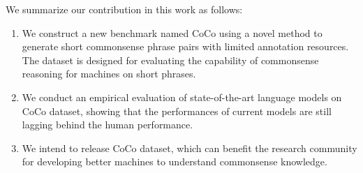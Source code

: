 

We summarize our contribution in this work as follows:
\begin{enumerate}
	\item We construct a new benchmark named CoCo using a novel method to generate short commonsense phrase pairs with limited annotation resources. The dataset is designed
	for evaluating %
	the capability of commonsense reasoning for machines on short phrases.
	\item We conduct an empirical evaluation of state-of-the-art language models on CoCo dataset, showing that the performances of current models  are still lagging behind the human performance.
	\item We intend to release CoCo dataset, which can  benefit the research community %
	for developing better machines to understand commonsense knowledge.
\end{enumerate}

